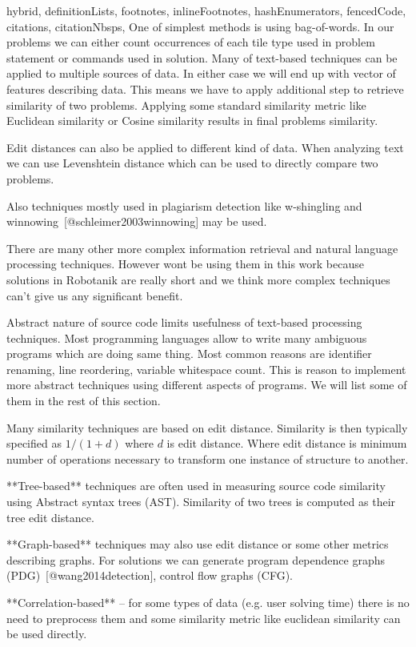 \documentclass[
  digital, %
  table,   %
  nolof,     %
  nolot,     %
  nocover
]{fithesis3}
\begin{document}
\begin{markdown*}{%
  hybrid,
  definitionLists,
  footnotes,
  inlineFootnotes,
  hashEnumerators,
  fencedCode,
  citations,
  citationNbsps,
}
One of simplest methods is using bag-of-words. In our problems we can either count occurrences of each tile type used in problem statement or commands used in solution. Many of text-based techniques can be applied to multiple sources of data. In either case we will end up with vector of features describing data. This means we have to apply additional step to retrieve similarity of two problems. Applying some standard similarity metric like Euclidean similarity or Cosine similarity results in final problems similarity.

Edit distances can also be applied to different kind of data. When analyzing text we can use Levenshtein distance which can be used to directly compare two problems.

Also techniques mostly used in plagiarism detection like w-shingling and winnowing~[@schleimer2003winnowing] may be used.

There are many other more complex information retrieval and natural language processing techniques. However wont be using them in this work because solutions in Robotanik are really short and we think more complex techniques can't give us any significant benefit.

Abstract nature of source code limits usefulness of text-based processing techniques. Most programming languages allow to write many ambiguous programs which are doing same thing. Most common reasons are identifier renaming, line reordering, variable whitespace count. This is reason to implement more abstract techniques using different aspects of programs. We will list some of them in the rest of this section.

Many similarity techniques are based on edit distance. Similarity is then typically specified as $1/(1+d)$ where $d$ is edit distance. Where edit distance is minimum number of operations necessary to transform one instance of structure to another.

**Tree-based** techniques are often used in measuring source code similarity using Abstract syntax trees (AST). Similarity of two trees is computed as their tree edit distance.

**Graph-based** techniques may also use edit distance or some other metrics describing graphs. For solutions we can generate program dependence graphs (PDG)~[@wang2014detection], control flow graphs (CFG).

**Correlation-based** -- for some types of data (e.g. user solving time) there is no need to preprocess them and some similarity metric like euclidean similarity can be used directly.


\end{markdown*}
\end{document}
